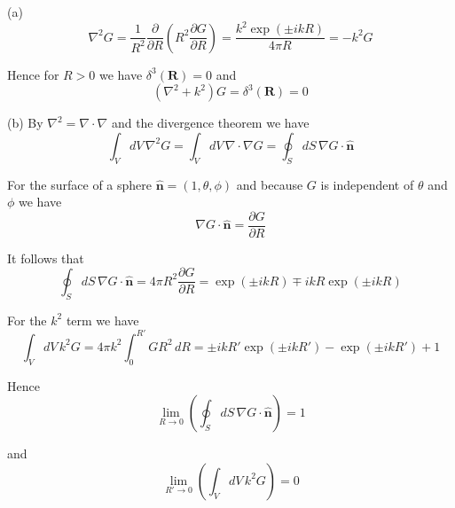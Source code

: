


(a)
\begin{equation*}
\nabla^2G=\frac{1}{R^2}\frac{\partial}{\partial R}
\left(R^2\frac{\partial G}{\partial R}\right)
=\frac{k^2\exp(\pm ikR)}{4\pi R}=-k^2G
\end{equation*}

Hence for $R>0$ we have $\delta^3(\mathbf R)=0$ and
\begin{equation*}
(\nabla^2+k^2)G=\delta^3(\mathbf R)=0
\end{equation*}

(b) By $\nabla^2=\nabla\cdot\nabla$ and the divergence theorem we have
\begin{equation*}
\int_VdV\,\nabla^2G
=\int_VdV\,\nabla\cdot\nabla G
=\oint_SdS\,\nabla G\cdot\hat{\mathbf n}
\end{equation*}

For the surface of a sphere $\hat{\mathbf n}=(1,\theta,\phi)$
and because $G$ is independent of $\theta$ and $\phi$ we have
\begin{equation*}
\nabla G\cdot\hat{\mathbf n}=\frac{\partial G}{\partial R}
\end{equation*}

It follows that
\begin{equation*}
\oint_SdS\,\nabla G\cdot\hat{\mathbf n}=4\pi R^2\frac{\partial G}{\partial R}
=\exp(\pm ikR)\mp ikR\exp(\pm ikR)
\end{equation*}

For the $k^2$ term we have
\begin{equation*}
\int_VdV\,k^2G=4\pi k^2\int_0^{R'}GR^2\,dR
=\pm ikR'\exp(\pm ikR')-\exp(\pm ikR')+1
\end{equation*}

Hence
\begin{equation*}
\lim_{R\rightarrow0}\left(\oint_SdS\,\nabla G\cdot\hat{\mathbf n}\right)=1
\end{equation*}

and
\begin{equation*}
\lim_{R'\rightarrow0}\left(\int_VdV\,k^2G\right)=0
\end{equation*}


